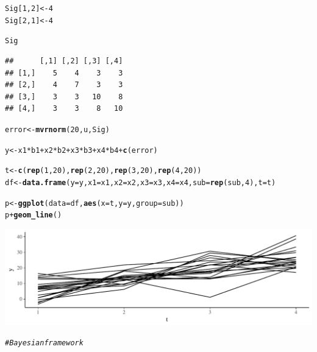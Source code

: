 \documentclass[11pt,a4paper,twoside]{book}\usepackage[]{graphicx}\usepackage[]{color}
\makeatletter
\newcommand{\hlnum}[1]{\textcolor[rgb]{0.686,0.059,0.569}{#1}}%
\newcommand{\hlcom}[1]{\textcolor[rgb]{0.678,0.584,0.686}{\textit{#1}}}%
\newcommand{\hlopt}[1]{\textcolor[rgb]{0,0,0}{#1}}%
\newcommand{\hlstd}[1]{\textcolor[rgb]{0.345,0.345,0.345}{#1}}%
\newcommand{\hlkwb}[1]{\textcolor[rgb]{0.69,0.353,0.396}{#1}}%
\newcommand{\hlkwc}[1]{\textcolor[rgb]{0.333,0.667,0.333}{#1}}%
\newcommand{\hlkwd}[1]{\textcolor[rgb]{0.737,0.353,0.396}{\textbf{#1}}}%
\newenvironment{kframe}{%
 \def\at@end@of@kframe{}%
 \ifinner\ifhmode%
  \def\at@end@of@kframe{\end{minipage}}%
  \begin{minipage}{\columnwidth}%
 \fi\fi%
 \def\FrameCommand##1{\hskip\@totalleftmargin \hskip-\fboxsep
 \colorbox{shadecolor}{##1}\hskip-\fboxsep
     \hskip-\linewidth \hskip-\@totalleftmargin \hskip\columnwidth}%
 \MakeFramed {\advance\hsize-\width
   \@totalleftmargin\z@ \linewidth\hsize
   \@setminipage}}%
 {\par\unskip\endMakeFramed%
 \at@end@of@kframe}
\newenvironment{knitrout}{}{} %
\makeatother
\begin{document}
\begin{knitrout}
\begin{kframe}
\begin{alltt}
\hlstd{Sig[}\hlnum{1}\hlstd{,}\hlnum{2}\hlstd{]} \hlkwb{<-} \hlnum{4}
\hlstd{Sig[}\hlnum{2}\hlstd{,}\hlnum{1}\hlstd{]} \hlkwb{<-}\hlnum{4}

\hlstd{Sig}
\end{alltt}
\begin{verbatim}
##      [,1] [,2] [,3] [,4]
## [1,]    5    4    3    3
## [2,]    4    7    3    3
## [3,]    3    3   10    8
## [4,]    3    3    8   10
\end{verbatim}
\begin{alltt}
\hlstd{error} \hlkwb{<-} \hlkwd{mvrnorm}\hlstd{(}\hlnum{20}\hlstd{, u, Sig)}

\hlstd{y}\hlkwb{<-} \hlstd{x1}\hlopt{*}\hlstd{b1} \hlopt{+}\hlstd{x2}\hlopt{*}\hlstd{b2} \hlopt{+} \hlstd{x3}\hlopt{*}\hlstd{b3} \hlopt{+}\hlstd{x4}\hlopt{*}\hlstd{b4} \hlopt{+}\hlkwd{c}\hlstd{(error)}


\hlstd{t} \hlkwb{<-} \hlkwd{c}\hlstd{(}\hlkwd{rep}\hlstd{(}\hlnum{1}\hlstd{,} \hlnum{20}\hlstd{),} \hlkwd{rep}\hlstd{(}\hlnum{2}\hlstd{,} \hlnum{20}\hlstd{),} \hlkwd{rep}\hlstd{(}\hlnum{3}\hlstd{,} \hlnum{20}\hlstd{),} \hlkwd{rep}\hlstd{(}\hlnum{4}\hlstd{,} \hlnum{20}\hlstd{))}
\hlstd{df} \hlkwb{<-} \hlkwd{data.frame}\hlstd{(}\hlkwc{y}\hlstd{=y,} \hlkwc{x1} \hlstd{= x1,} \hlkwc{x2}\hlstd{=x2 ,} \hlkwc{x3} \hlstd{= x3,} \hlkwc{x4} \hlstd{= x4,} \hlkwc{sub} \hlstd{=} \hlkwd{rep}\hlstd{(sub,}\hlnum{4}\hlstd{),} \hlkwc{t} \hlstd{=t)}



\hlstd{p} \hlkwb{<-} \hlkwd{ggplot}\hlstd{(}\hlkwc{data} \hlstd{= df,} \hlkwd{aes}\hlstd{(}\hlkwc{x} \hlstd{= t,} \hlkwc{y} \hlstd{= y,} \hlkwc{group} \hlstd{= sub))}
\hlstd{p} \hlopt{+} \hlkwd{geom_line}\hlstd{()}
\end{alltt}
\end{kframe}

{\centering \includegraphics[width=\textwidth-3cm]{figure/ch04_figsimdata_repeated_unstruct-1} 

}


\begin{kframe}\begin{alltt}
\hlcom{# Bayesian framework}


\end{alltt}
\end{kframe}
\end{knitrout}
\end{document}
